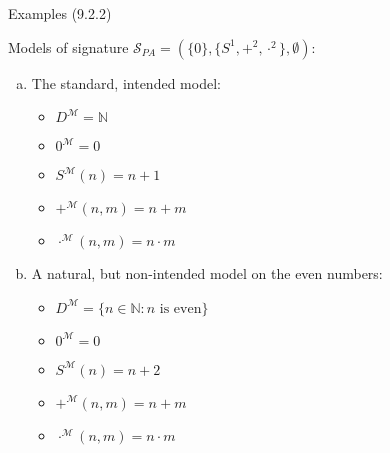 \begin{frame}{Examples (9.2.2)}

Models of signature $\mathcal{S}_{PA}=(\{0\}, \{S^1, +^2, \cdot^2\}, \emptyset)$:

\bigskip
				
				\begin{enumerate}[(a)]
				\itemsep=16pt
				
					\item The standard, intended model:
					
						\begin{itemize}
					
							\item $D^\mathcal{M}=\mathbb{N}$
							
							\item $0^\mathcal{M}=0$
					
							\item $S^\mathcal{M}(n)=n+1$
							
							\item $+^\mathcal{M}(n,m)=n+m$
							
							\item $\cdot^\mathcal{M}(n,m)=n\cdot m$
					
						\end{itemize}
						
					\item A natural, but non-intended model on the even numbers:
					
						\begin{itemize}
					
							\item $D^\mathcal{M}=\{n\in\mathbb{N}:n\text{ is even}\}$
																					\item $0^\mathcal{M}=0$
					
							\item $S^\mathcal{M}(n)=n+2$
							
							\item $+^\mathcal{M}(n,m)=n+m$
							
							\item $\cdot^\mathcal{M}(n,m)=n\cdot m$
					
						\end{itemize}
\end{enumerate}

\end{frame}

